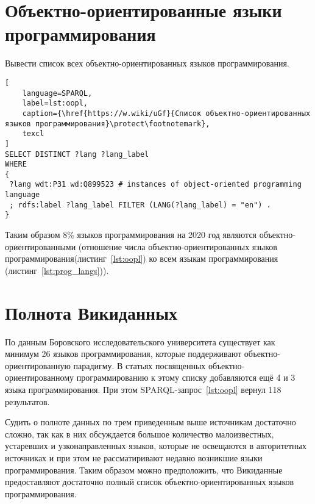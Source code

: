 \section{Объектно-ориентированные языки программирования}
Вывести список всех объектно-ориентированных языков программирования.

\begin{lstlisting}[
	language=SPARQL,
	label=lst:oopl,
	caption={\href{https://w.wiki/uGf}{Список объектно-ориентированных языков программирования}\protect\footnotemark},
	texcl
]
SELECT DISTINCT ?lang ?lang_label
WHERE
{
 ?lang wdt:P31 wd:Q899523 # instances of object-oriented programming language
 ; rdfs:label ?lang_label FILTER (LANG(?lang_label) = "en") . 
}
\end{lstlisting}


Таким образом 8\% языков программирования на 2020 год являются объектно-ориентированными (отношение числа объектно-ориентированных языков программирования(листинг~\ref{lst:oopl}) ко всем языкам программирования (листинг~\ref{lst:prog_langs})).

\section{Полнота Викиданных}
По данным Боровского исследовательского университета\cite{oo_langs_bourabai} существует как минимум 26 языков программирования, которые поддерживают объектно-ориентированную парадигму. В статьях посвященных объектно-ориентированному программированию к этому списку добавляются ещё 4\cite{oo_langs_science_wikia} и 3\cite{oo_langs_garshin} языка программирования. При этом SPARQL-запрос~\ref{lst:oopl} вернул 118 результатов.

Судить о полноте данных по трем приведенным выше источникам достаточно сложно, так как в них обсуждается большое количество малоизвестных, устаревших и узконаправленных языков, которые не освещаются в авторитетных источниках и при этом не рассматиривают недавно возникшие языки программирования. Таким образом можно предположить, что Викиданные предоставляют достаточно полный список объектно-ориентированных языков программирования.

